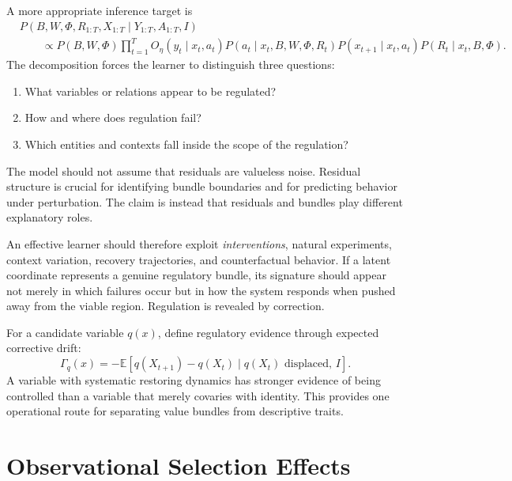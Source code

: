 \documentclass[11pt]{article}
\newcommand{\E}{\mathbb{E}}
\begin{document}
A more appropriate inference target is
\begin{align}
&P(B,W,\Phi,R_{1:T},X_{1:T}\mid
Y_{1:T},A_{1:T},I)
\nonumber\\
&\qquad\propto
P(B,W,\Phi)
\prod_{t=1}^{T}
O_\eta(y_t\mid x_t,a_t)
P(a_t\mid x_t,B,W,\Phi,R_t)
P(x_{t+1}\mid x_t,a_t)
P(R_t\mid x_t,B,\Phi).
\label{eq:fullmodel}
\end{align}
The decomposition forces the learner to distinguish three questions:
\begin{enumerate}[nosep,leftmargin=1.5em]
    \item What variables or relations appear to be regulated?
    \item How and where does regulation fail?
    \item Which entities and contexts fall inside the scope of the regulation?
\end{enumerate}

The model should not assume that residuals are valueless noise. Residual structure is crucial for identifying bundle boundaries and for predicting behavior under perturbation. The claim is instead that residuals and bundles play different explanatory roles.

An effective learner should therefore exploit \emph{interventions}, natural experiments, context variation, recovery trajectories, and counterfactual behavior. If a latent coordinate represents a genuine regulatory bundle, its signature should appear not merely in which failures occur but in how the system responds when pushed away from the viable region. Regulation is revealed by correction.

For a candidate variable $q(x)$, define regulatory evidence through expected corrective drift:
\begin{equation}
    \Gamma_q(x)
    =
    -\E[
       q(X_{t+1})-q(X_t)
       \mid q(X_t)\text{ displaced},\,I
    ].
\end{equation}
A variable with systematic restoring dynamics has stronger evidence of being controlled than a variable that merely covaries with identity. This provides one operational route for separating value bundles from descriptive traits.

\section{Observational Selection Effects}
\end{document}
